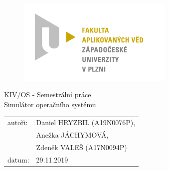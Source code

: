 \documentclass[11pt,a4paper]{scrartcl}
\begin{document}
	\begin{figure}[h!]
		\centering
		\includegraphics[bb= 0 0 820 445 , width=75mm]{favlogo.jpg}
	\end{figure}
	
	\vspace{5cm}
	
	{\centering
		{\huge KIV/OS - Semestrální práce}\\[1em]
		{\large Simulátor operačního systému}\\[7,5cm]
	}
	
	\begin{center}
		\begin{tabular}{l l}
		autoři: & Daniel HRYZBIL (A19N0076P), \\
		& Anežka JÁCHYMOVÁ, \\
		& Zdeněk VALEŠ (A17N0094P) \\
		datum: & 29.11.2019 \\
		\end{tabular}
	\end{center}
	
	\thispagestyle{empty}
	\newpage
	
\end{document}
